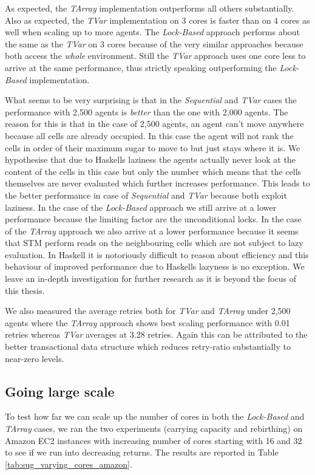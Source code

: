 As expected, the \textit{TArray} implementation outperforms all others substantially. Also as expected, the \textit{TVar} implementation on 3 cores is faster than on 4 cores as well when scaling up to more agents. The \textit{Lock-Based} approach performs about the same as the \textit{TVar} on 3 cores because of the very similar approaches because both access the \textit{whole} environment. Still the \textit{TVar} approach uses one core less to arrive at the same performance, thus strictly speaking outperforming the \textit{Lock-Based} implementation.

What seems to be very surprising is that in the \textit{Sequential} and \textit{TVar} cases the performance with 2,500 agents is \textit{better} than the one with 2,000 agents. The reason for this is that in the case of 2,500 agents, an agent can't move anywhere because all cells are already occupied. In this case the agent will not rank the cells in order of their maximum sugar to move to but just stays where it is. We hypothesise that due to Haskells laziness the agents actually never look at the content of the cells in this case but only the number which means that the cells themselves are never evaluated which further increases performance. This leads to the better performance in case of \textit{Sequential} and \textit{TVar} because both exploit laziness.
In the case of the \textit{Lock-Based} approach we still arrive at a lower performance because the limiting factor are the unconditional locks. In the case of the \textit{TArray} approach we also arrive at a lower performance because it seems that STM perform reads on the neighbouring cells which are not subject to lazy evaluation. In Haskell it is notoriously difficult to reason about efficiency and this behaviour of improved performance due to Haskells lazyness is no exception. We leave an in-depth investigation for further research as it is beyond the focus of this thesis.

We also measured the average retries both for \textit{TVar} and \textit{TArray} under 2,500 agents where the \textit{TArray} approach shows best scaling performance with 0.01 retries whereas \textit{TVar} averages at 3.28 retries. Again this can be attributed to the better transactional data structure which reduces retry-ratio substantially to near-zero levels.

\subsection{Going large scale}
To test how far we can scale up the number of cores in both the \textit{Lock-Based} and \textit{TArray} cases, we ran the two experiments (carrying capacity and rebirthing) on Amazon EC2 instances with increasing number of cores starting with 16 and 32 to see if we run into decreasing returns. The results are reported in Table \ref{tab:sug_varying_cores_amazon}.


